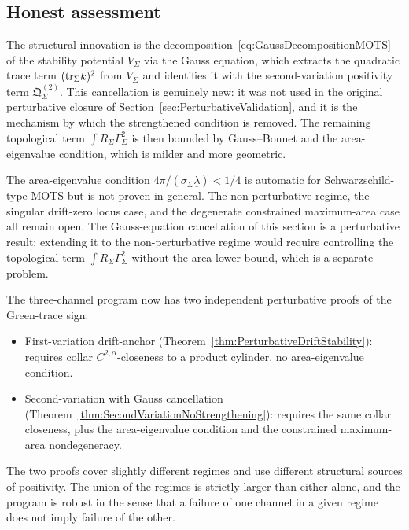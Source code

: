 \subsection{Honest assessment}

\begin{remark}\label{rem:GaussCancellationNew}
The structural innovation is the decomposition~\eqref{eq:GaussDecompositionMOTS} of the stability potential $V_\Sigma$ via the Gauss equation, which extracts the quadratic trace term $(\mathrm{tr}_\Sigma k)^2$ from $V_\Sigma$ and identifies it with the second-variation positivity term $\mathfrak Q_\Sigma^{(2)}$. This cancellation is genuinely new: it was not used in the original perturbative closure of Section~\ref{sec:PerturbativeValidation}, and it is the mechanism by which the strengthened condition is removed. The remaining topological term $\int R_\Sigma\Gamma_\Sigma^2$ is then bounded by Gauss--Bonnet and the area-eigenvalue condition, which is milder and more geometric.
\end{remark}

\begin{remark}\label{rem:GaussCancellationOpen}
The area-eigenvalue condition $4\pi/(\sigma_\Sigma\underline\lambda)<1/4$ is automatic for Schwarzschild-type MOTS but is not proven in general. The non-perturbative regime, the singular drift-zero locus case, and the degenerate constrained maximum-area case all remain open. The Gauss-equation cancellation of this section is a perturbative result; extending it to the non-perturbative regime would require controlling the topological term $\int R_\Sigma\Gamma_\Sigma^2$ without the area lower bound, which is a separate problem.
\end{remark}

\begin{remark}\label{rem:Robustness}
The three-channel program now has two independent perturbative proofs of the Green-trace sign:
\begin{itemize}
    \item First-variation drift-anchor (Theorem~\ref{thm:PerturbativeDriftStability}): requires collar $C^{2,\alpha}$-closeness to a product cylinder, no area-eigenvalue condition.
    \item Second-variation with Gauss cancellation (Theorem~\ref{thm:SecondVariationNoStrengthening}): requires the same collar closeness, plus the area-eigenvalue condition and the constrained maximum-area nondegeneracy.
\end{itemize}
The two proofs cover slightly different regimes and use different structural sources of positivity. The union of the regimes is strictly larger than either alone, and the program is robust in the sense that a failure of one channel in a given regime does not imply failure of the other.
\end{remark}
